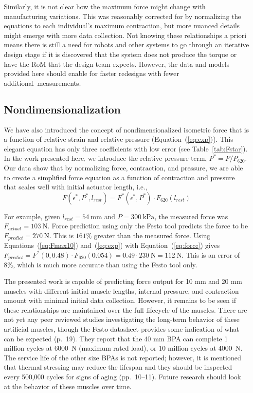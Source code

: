 \documentclass[actuators,article,accept,pdftex,moreauthors]{Definitions/mdpi}
\begin{document}
Similarly, it is not clear how the maximum force might change with manufacturing variations. This was reasonably corrected for by normalizing the equations to each individual's maximum contraction, but more nuanced details might emerge with more data collection. Not knowing these relationships a priori means there is still a need for robots and other systems to go through an iterative design stage if it is discovered that the system does not produce the torque or have the RoM that the design team expects. However, the data and models provided here should enable for faster redesigns with fewer \mbox{additional measurements.}

\subsection{Nondimensionalization}

We have also introduced the concept of nondimensionalized isometric force that is a function of relative strain and relative pressure (Equation~(\ref{eq:exp})). This elegant equation has only three coefficients with low error (see Table~\ref{tab:Fstar}). In the work presented here, we introduce the relative pressure term, $P^*=P/P_{620}$. Our data show that by normalizing force, contraction, and pressure, we are able to create a simplified force equation as a function of contraction and pressure that scales well with initial actuator length, i.e.,
 \begin{equation}
   F(\epsilon^*,P^*,l_{rest}) = F^*(\epsilon^*,P^*) \cdot F_{620}(l_{rest}) \label{eq:force}
\end{equation}

For example, given $l_{rest}=\qty{54}{\mm}$ and $P=\qty{300}{\kPa}$, the measured force was \mbox{$F_{actual} = \qty{103}{\N}$.} Force prediction using only the Festo tool predicts the force to be \mbox{$F_{predict} = \qty{270}{\N}$.} This is $161\%$ greater than the measured force. Using Equations~(\ref{eq:Fmax10}) and~(\ref{eq:exp}) with Equation~(\ref{eq:force}) gives $F_{predict} = F^*(0, 0.48) \cdot F_{620}(0.054) = 0.49 \cdot \qty{230}{\N} = \qty{112}{\N}$. This is an error of $8\%$, which is much more accurate than using the Festo tool only.

The presented work is capable of predicting force output for 10 mm and 20 mm muscles with different initial muscle lengths, internal pressure, and contraction amount with minimal initial data collection. However, it remains to be seen if these relationships are maintained over the full lifecycle of the muscles. There are not yet any peer reviewed studies investigating the long-term behavior of these artificial muscles, though the Festo datasheet provides some indication of what can be expected \citep{festo_2026} (p.~19). They report that the 40 mm BPA can complete 1 million cycles at \qty{6000}{\N} (maximum rated load), or 10 million cycles at \qty{4000}{\N}. The service life of the other size BPAs is not reported; however, it is mentioned that thermal stressing may reduce the lifespan and they should be inspected every 500,000 cycles for signs of aging \citep{festo_2018} (pp.~10--11). Future research should look at the behavior of these muscles over time.
\end{document}
